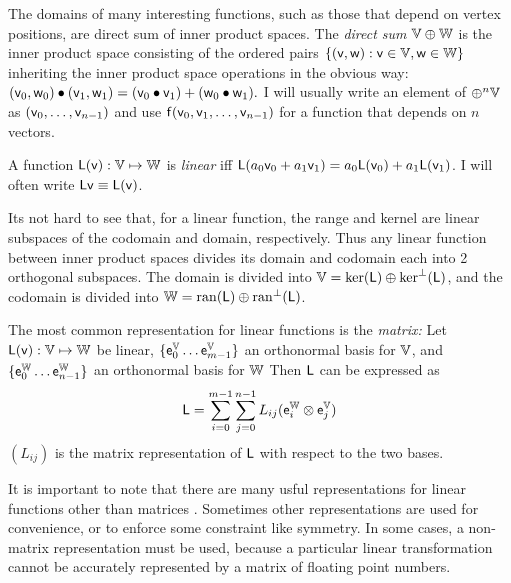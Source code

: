 The domains of many interesting functions,
such as those that depend on vertex positions,
are direct sum of inner product spaces.
The \textit{direct sum} $\mathbb{V} \oplus \mathbb{W}$ is the inner product space
consisting of the ordered pairs $\{ (\mathsf{v},\mathsf{w}) : \mathsf{v} \in \mathbb{V}, \mathsf{w} \in \mathbb{W} \}$
inheriting the inner product space operations in the obvious way:
$(\mathsf{v}_0,\mathsf{w}_0) \bullet (\mathsf{v}_1,\mathsf{w}_1) = (\mathsf{v}_0 \bullet \mathsf{v}_1) + (\mathsf{w}_0 \bullet \mathsf{w}_1).$
I will usually write an element of $\oplus^n \mathbb{V}$ as
$(\mathsf{v}_0,\ldots,\mathsf{v}_{n-1})$
and use
$\mathsf{f}(\mathsf{v}_0,\mathsf{v}_1,\ldots,\mathsf{v}_{n-1})$
for a function that depends on $n$ vectors.

\label{sec:linear-functions}

A function $\mathsf{L}(\mathsf{v}):\mathbb{V} \mapsto \mathbb{W}$
is \textit{linear} iff
$\mathsf{L}(a_0 \mathsf{v}_0 + a_1 \mathsf{v}_1) = a_0 \mathsf{L}(\mathsf{v}_0) + a_1 \mathsf{L}(\mathsf{v}_1)$.
I will often write $\mathsf{L}\mathsf{v} \equiv \mathsf{L}(\mathsf{v})$.

Its not hard to see that, for a linear function,
the range and kernel are linear subspaces of the codomain and
domain, respectively.
Thus any linear function between inner product spaces
divides its domain and codomain each into 2 orthogonal subspaces.
The domain is divided into $\mathbb{V} = \mathrm{ker}(\mathsf{L}) \oplus \mathrm{ker}^{\perp}(\mathsf{L})$,
and the codomain is divided into $\mathbb{W} = \mathrm{ran}(\mathsf{L}) \oplus \mathrm{ran}^{\perp}(\mathsf{L})$.

The most common representation for linear functions is the \textit{matrix:}
Let $\mathsf{L}(\mathsf{v}):\mathbb{V} \mapsto \mathbb{W}$ be linear,
$\{ \mathsf{e}_0^{\mathbb{V}} \ldots  \mathsf{e}_{m-1}^{\mathbb{V}} \}$ an orthonormal basis for $\mathbb{V}$,
and
$\{ \mathsf{e}_0^{\mathbb{W}} \ldots \mathsf{e}_{n-1}^{\mathbb{W}} \}$ an orthonormal  basis for $\mathbb{W}$
Then $\mathsf{L}$ can be expressed as
\begin{equation}
\mathsf{L}
 =
\sum_{i=0}^{m-1} \sum_{j=0}^{n-1} L_{ij} ( \mathsf{e}_i^{\mathbb{W}} \otimes \mathsf{e}_j^{\mathbb{V}} )
\end{equation}
$(L_{ij})$ is the matrix representation of $\mathsf{L}$ with respect to
the two bases\cite{halmos-1958}.

It is important to note that there are many usful
representations for linear functions other than matrices \cite{mcdonald-1989b}.
Sometimes other representations are used for convenience,
or to enforce some constraint like symmetry.
In some cases, a non-matrix representation must be used,
because a particular linear transformation
cannot be accurately represented by a matrix of floating point numbers.

